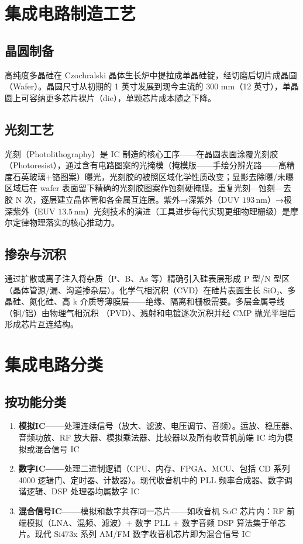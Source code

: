 \documentclass[12pt,UTF8]{ctexbook}
\begin{document}
\section{集成电路制造工艺}
\label{sec:ic_fabrication}

\subsection{晶圆制备}

高纯度多晶硅在 Czochralski 晶体生长炉中提拉成单晶硅锭，经切磨后切片成晶圆（Wafer）。晶圆尺寸从初期的 1 英寸发展到现今主流的 300 mm（12 英寸），单晶圆上可容纳更多芯片裸片（die），单颗芯片成本随之下降。

\subsection{光刻工艺}

光刻（Photolithography）是 IC 制造的核心工序——在晶圆表面涂覆光刻胶（Photoresist），通过含有电路图案的光掩模（掩模版——手绘分辨光路——高精度石英玻璃+铬图案）曝光，光刻胶的被照区域化学性质改变；显影去除曝/未曝区域后在 wafer 表面留下精确的光刻胶图案作蚀刻硬掩膜。重复光刻—蚀刻—去胶 N 次，逐层建立晶体管和各金属互连层。紫外→深紫外（DUV $193\,\mathrm{nm}$）→极深紫外（EUV $13.5\,\mathrm{nm}$）光刻技术的演进（工具进步每代实现更细物理栅级）是摩尔定律物理落实的核心推动力。

\subsection{掺杂与沉积}

通过扩散或离子注入将杂质（P、B、As 等）精确引入硅表层形成 P 型/N 型区（晶体管源/漏、沟道掺杂层）。化学气相沉积（CVD）在硅片表面生长 SiO₂、多晶硅、氮化硅、高 k 介质等薄膜层——绝缘、隔离和栅极需要。多层金属导线（铜/铝）由物理气相沉积 （PVD）、溅射和电镀逐次沉积并经 CMP 抛光平坦后形成芯片互连结构。

\section{集成电路分类}
\label{sec:ic_classification}

\subsection{按功能分类}


\begin{enumerate}
\item \textbf{模拟IC——}处理连续信号（放大、滤波、电压调节、音频）。运放、稳压器、音频功放、RF 放大器、模拟乘法器、比较器以及所有收音机前端 IC 均为模拟或混合信号 IC
\item \textbf{数字IC——}处理二进制逻辑（CPU、内存、FPGA、MCU、包括 CD 系列 4000 逻辑门、定时器、计数器）。现代收音机中的 PLL 频率合成器、数字调谐逻辑、DSP 处理器均属数字 IC
\item \textbf{混合信号IC——}模拟和数字共存同一芯片——如收音机 SoC 芯片内：RF 前端模拟（LNA、混频、滤波）+ 数字 PLL + 数字音频 DSP 算法集于单芯片。现代 Si473x 系列 AM/FM 数字收音机芯片即为混合信号 IC
\end{enumerate}
\end{document}
